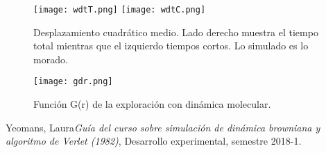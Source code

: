 \documentclass[12pt,letterpaper]{article}
\begin{document}
\begin{figure}[H]
	\centering
	\texttt{[image: wdtT.png]}
	\texttt{[image: wdtC.png]}	
	\caption{Desplazamiento cuadrático medio. Lado derecho muestra el tiempo total mientras que el izquierdo tiempos cortos. Lo simulado es lo morado.}
\end{figure}
\begin{figure}[H]
	\centering
	\texttt{[image: gdr.png]}
	\caption{Función G(r) de la exploración con dinámica molecular.}
\end{figure}


\begin{thebibliography}{widestlabel}
  Yeomans, Laura\emph{Guía del curso sobre simulación de dinámica browniana y algoritmo de Verlet (1982)}, Desarrollo experimental, semestre 2018-1.
\end{thebibliography}
\end{document}

